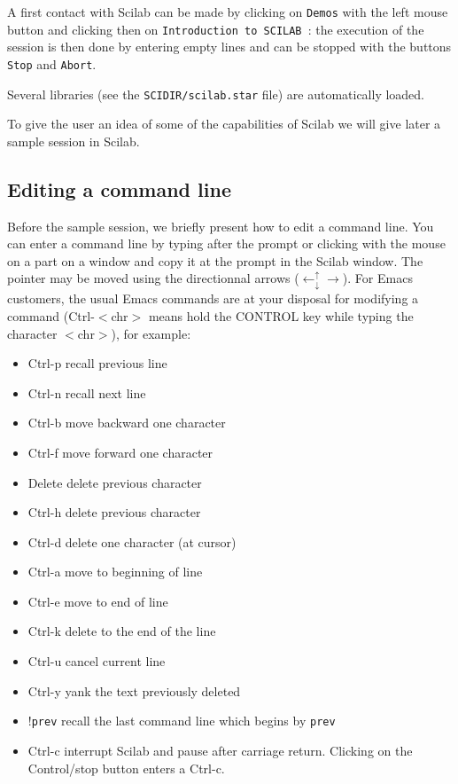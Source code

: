 A first contact with Scilab can be made by clicking 
on {\tt Demos} with the left mouse button and clicking then on 
{\tt Introduction to SCILAB }: the 
execution of the session is then done by entering empty lines and can be
stopped with the buttons {\tt Stop} and {\tt Abort}.

  Several libraries
(see the {\tt SCIDIR/scilab.star} file) are automatically loaded.
        
To give the user an idea of some of the capabilities of Scilab
we will give later a sample session in Scilab.\\

\subsection{Editing a command line}

Before the sample session, we briefly present how to edit a command line.
You can enter a command line by typing after the prompt or clicking with the 
mouse on a part on a window and copy it at the prompt in the Scilab
window. 
The pointer may be moved using the directionnal arrows
($\leftarrow^\uparrow_\downarrow \rightarrow$). For Emacs customers,
the usual Emacs commands are at your 
disposal for modifying a command (Ctrl-$<$chr$>$  means hold the CONTROL key 
while typing the character $<$chr$>$), for example:

\bigskip


%
\begin{itemize}
\item Ctrl-p    recall previous line
\item Ctrl-n    recall next line
\item Ctrl-b    move backward one character
\item Ctrl-f    move forward one character
\item Delete    delete previous character
\item Ctrl-h    delete previous character
\item Ctrl-d    delete one character (at cursor)
\item Ctrl-a    move to beginning of line
\item Ctrl-e    move to end of line
\item Ctrl-k    delete to the end of the line
\item Ctrl-u    cancel current line
\item Ctrl-y    yank the text previously deleted
\item !{\tt prev}     recall the last command line which begins by {\tt prev}
\item Ctrl-c    interrupt Scilab and pause after carriage return. 
Clicking on the Control/stop button enters a Ctrl-c.
\end{itemize}
%


